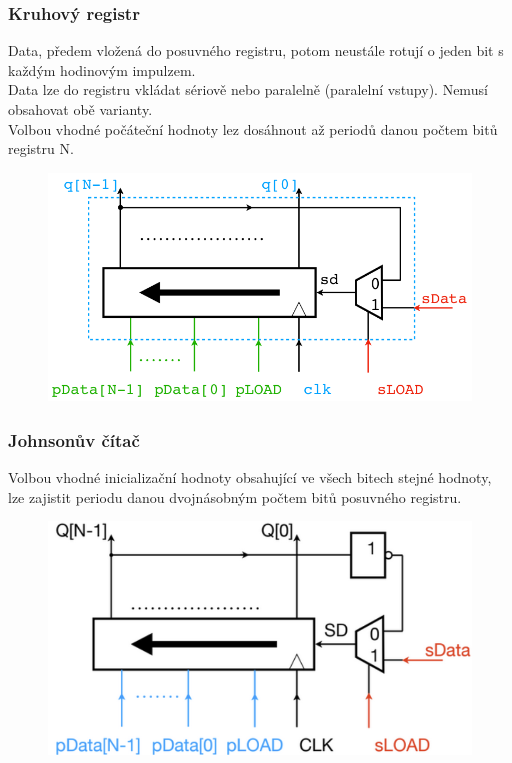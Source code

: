 \subsubsection{Kruhový registr}
Data, předem vložená do posuvného registru, potom neustále rotují o jeden bit s každým hodinovým impulzem.\\
Data lze do registru vkládat sériově nebo paralelně (paralelní vstupy). Nemusí obsahovat obě varianty.\\
Volbou vhodné počáteční hodnoty lez dosáhnout až periodů danou počtem bitů registru N.\\
\begin{figure}[h!]
    \centering
    \includegraphics[scale = 0.4]{img/KruhCt.png}
\end{figure}

\subsubsection{Johnsonův čítač}
Volbou vhodné inicializační hodnoty obsahující ve všech bitech stejné hodnoty, lze zajistit periodu danou dvojnásobným počtem bitů posuvného registru.
\begin{figure}[h!]
    \centering
    \includegraphics[scale = 0.4]{img/Johnson.png}
\end{figure}

